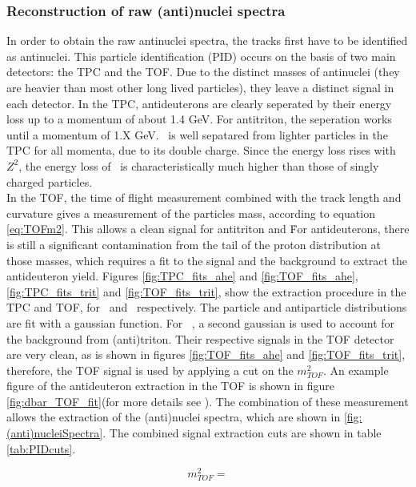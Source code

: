 \subsubsection{Reconstruction of raw (anti)nuclei spectra}
In order to obtain the raw antinuclei spectra, the tracks first have to be identified as antinuclei. This particle identification (PID) occurs on the basis of two main detectors: the TPC and the TOF. Due to the distinct masses of antinuclei (they are heavier than most other long lived particles), they leave a distinct signal in each detector. In the TPC, antideuterons are clearly seperated by their energy loss up to a momentum of about 1.4 GeV. For antitriton, the seperation works until a momentum of 1.X GeV. \ahe\ is well sepatared from lighter particles in the TPC for all momenta, due to its double charge. Since the energy loss rises with $Z^2$, the energy loss of \ahe\ is characteristically much higher than those of singly charged particles. \\
In the TOF, the time of flight measurement combined with the track length and curvature gives a measurement of the particles mass, according to equation \ref{eq:TOFm2}. This allows a clean signal for antitriton and \ahe\. For antideuterons, there is still a significant contamination from the tail of the proton distribution at those masses, which requires a fit to the signal and the background to extract the antideuteron yield. Figures \ref{fig:TPC_fits_ahe} and \ref{fig:TOF_fits_ahe}, \ref{fig:TPC_fits_trit} and \ref{fig:TOF_fits_trit}, show the extraction procedure in the TPC and TOF, for \ahe\ and \atrit\, respectively. The particle and antiparticle distributions are fit with a gaussian function. For \ahe\ , a second gaussian is used to account for the background from (anti)triton. Their respective signals in the TOF detector are very clean, as is shown in figures \ref{fig:TOF_fits_ahe} and \ref{fig:TOF_fits_trit}, therefore, the TOF signal is used by applying a cut on the $m_{TOF}^2$. An example figure of the antideuteron extraction in the TOF is shown in figure \ref{fig:dbar_TOF_fit}(for more details see \cite{dbar_ann}). The combination of these measurement allows the extraction of the (anti)nuclei spectra, which are shown in \ref{fig:(anti)nucleiSpectra}. The combined signal extraction cuts are shown in table \ref{tab:PIDcuts}.

\begin{equation}\label{eq:TOFm2}
    m_{TOF}^2 =     
\end{equation}


